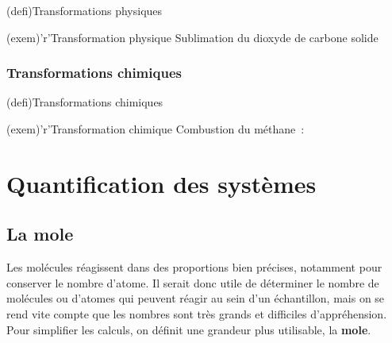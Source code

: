 \documentclass[../../main/main.tex]{subfiles}
\begin{document}
\begin{tcbraster}[raster columns=2, raster equal height=rows]
	\begin{tcb}[label=def:transnuc](defi){Transformations physiques}
	\end{tcb}
	\begin{tcb}[label=exem:transnuc](exem)'r'{Transformation physique}
		Sublimation du dioxyde de carbone solide
		\vspace{-15pt}
	\end{tcb}
\end{tcbraster}

\subsubsection{Transformations chimiques}

\begin{tcbraster}[raster columns=2, raster equal height=rows]
	\begin{tcb}[label=def:transnuc](defi){Transformations chimiques}
	\end{tcb}
	\begin{tcb}[label=exem:transnuc](exem)'r'{Transformation chimique}
		Combustion du méthane~:
		\csw{
			\[
				\ce{CH4\gaz{} + 2O2\gaz{} = CO2\gaz{} + 2H2O\gaz{}}
			\]
		}
	\end{tcb}
	\vspace{-15pt}
\end{tcbraster}

\section{Quantification des systèmes}
\subsection{La mole}

Les molécules réagissent dans des proportions bien précises, notamment pour
conserver le nombre d'atome. Il serait donc utile de déterminer le nombre de
molécules ou d'atomes qui peuvent réagir au sein d'un échantillon, mais on se
rend vite compte que les nombres sont très grands et difficiles d'appréhension.
Pour simplifier les calculs, on définit une grandeur plus utilisable, la
\textbf{mole}.
\end{document}
